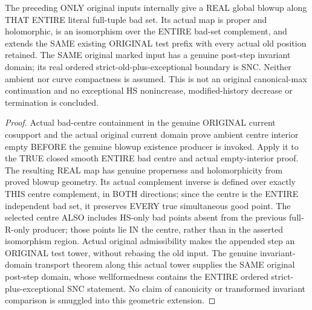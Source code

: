 \begin{theorem}
\label{hir:original-smooth-curve-whole-tuple-bad-global-blowup-prefix}
\leanok
The preceding ONLY original inputs internally give a REAL global blowup
along THAT ENTIRE literal full-tuple bad set. Its actual map is proper and
holomorphic, is an isomorphism over the ENTIRE bad-set complement, and
extends the SAME existing ORIGINAL test prefix with every actual old
position retained. The SAME original marked input has a genuine post-step
invariant domain; its real ordered strict-old-plus-exceptional boundary
is SNC. Neither ambient nor curve compactness is assumed. This is not an
original canonical-max continuation and no exceptional HS nonincrease,
modified-history decrease or termination is concluded.
\end{theorem}
\begin{proof}
Actual bad-centre containment in the genuine ORIGINAL current cosupport
and the actual original current domain prove ambient centre interior empty
BEFORE the genuine blowup existence producer is invoked. Apply it to the
TRUE closed smooth ENTIRE bad centre and actual empty-interior proof.
The resulting REAL map has genuine properness and holomorphicity from
proved blowup geometry. Its actual complement inverse is defined over
exactly THIS centre complement, in BOTH directions; since the centre is
the ENTIRE independent bad set, it preserves EVERY true simultaneous good
point. The selected centre ALSO includes HS-only bad points absent from
the previous full-R-only producer; those points lie IN the centre, rather
than in the asserted isomorphism region. Actual original admissibility makes the appended step an ORIGINAL
test tower, without rebasing the old input. The genuine invariant-domain
transport theorem along this actual tower supplies the SAME original
post-step domain, whose wellformedness contains the ENTIRE ordered
strict-plus-exceptional SNC statement. No claim of canonicity or transformed
invariant comparison is smuggled into this geometric extension.
\end{proof}
